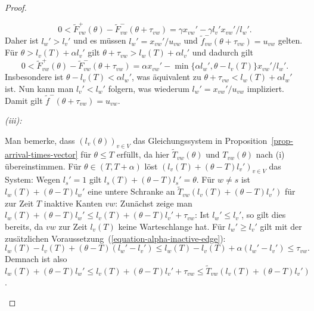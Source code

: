 \begin{proof}
\begin{description}[leftmargin=0cm, topsep=0cm, itemindent=0.5cm]
		\[
		0<\tilde{F}_{vw}^+(\theta) - \tilde{F}_{vw}^-(\theta + \tau_{vw})= \gamma x_{vw}' - \gamma l_v' x_{vw}'/l_w'.
		\]
		Daher ist $l_w' > l_v'$ und es müssen $l_w' = x_{vw}'/u_{vw}$ und $\tilde{f}_{vw}^-(\theta + \tau_{vw}) = u_{vw}$ gelten.
		Für $\theta > l_v(T) + \alpha l_v'$ gilt $\theta + \tau_{vw} > l_w(T) + \alpha l_v'$ und dadurch gilt
		\[
		0 < \tilde{F}_{vw}^+(\theta) - \tilde{F}_{vw}^-(\theta + \tau_{vw}) = \alpha x_{vw}' - \min \{ \alpha l_w', \theta - l_v(T) \}x_{vw}'/l_w'.
		\]
		Insbesondere ist $\theta - l_v(T) < \alpha l_w'$, was äquivalent zu $\theta + \tau_{vw} < l_w(T) + \alpha l_w'$ ist.
		Nun kann man $l_v' < l_w'$ folgern, was wiederum $l_w' = x_{vw}'/u_{vw}$ impliziert.
		Damit gilt $\tilde{f}^-(\theta + \tau_{vw}) = u_{vw}$.
		
		\item[Zu Aussage]\emph{(iii):}
		
		Man bemerke, dass $(l_v(\theta))_{v\in V}$ das Gleichungssystem in Proposition~\ref{prop-arrival-times-vector} für $\theta \leq T$ erfüllt, da hier $\tilde{T}_{vw}(\theta)$ und $T_{vw}(\theta)$ nach (i) übereinstimmen.
		Für $\theta \in (T, T+\alpha)$ löst $(l_v(T) + (\theta - T)l_v')_{v\in V}$ das System:
		Wegen $l_s' = 1$ gilt $l_s(T) + (\theta - T)l_s' = \theta$.
		Für $w\neq s$ ist $l_w(T) + (\theta - T) l_w'$ eine untere Schranke an $\tilde{T}_{vw}(l_v(T) + (\theta - T) l_v')$ für zur Zeit $T$ inaktive Kanten $vw$:
		Zunächst zeige man $l_w(T) + (\theta - T)l_w' \leq l_v(T) + (\theta - T)l_v' + \tau_{vw}$:
		Ist $l_w' \leq l_v'$, so gilt dies bereits, da $vw$ zur Zeit $l_v(T)$ keine Warteschlange hat.
		Für $l_w' \geq l_v'$ gilt mit der zusätzlichen Voraussetzung~(\ref{equation-alpha-inactive-edge}):
		\[
		l_w(T) - l_v(T) + (\theta - T) (l_w' - l_v') \leq l_w(T) - l_v(T) + \alpha (l_w' - l_v') \leq \tau_{vw}.
		\]
		Demnach ist also $l_w(T) + (\theta - T) l_w' \leq l_v(T) + (\theta - T) l_v' + \tau_{vw} \leq \tilde{T}_{vw}(l_v(T) + (\theta - T) l_v')$.
		

\end{description}
\end{proof}
